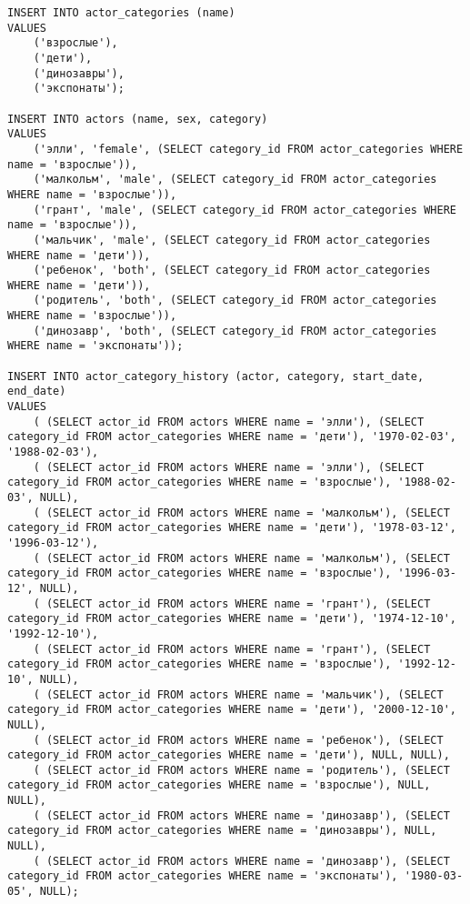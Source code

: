 
\begin{verbatim}
INSERT INTO actor_categories (name)
VALUES
    ('взрослые'),
    ('дети'),
    ('динозавры'),
    ('экспонаты');

INSERT INTO actors (name, sex, category)
VALUES
    ('элли', 'female', (SELECT category_id FROM actor_categories WHERE name = 'взрослые')),
    ('малкольм', 'male', (SELECT category_id FROM actor_categories WHERE name = 'взрослые')),
    ('грант', 'male', (SELECT category_id FROM actor_categories WHERE name = 'взрослые')),
    ('мальчик', 'male', (SELECT category_id FROM actor_categories WHERE name = 'дети')),
    ('ребенок', 'both', (SELECT category_id FROM actor_categories WHERE name = 'дети')),
    ('родитель', 'both', (SELECT category_id FROM actor_categories WHERE name = 'взрослые')),
    ('динозавр', 'both', (SELECT category_id FROM actor_categories WHERE name = 'экспонаты'));

INSERT INTO actor_category_history (actor, category, start_date, end_date)
VALUES
    ( (SELECT actor_id FROM actors WHERE name = 'элли'), (SELECT category_id FROM actor_categories WHERE name = 'дети'), '1970-02-03', '1988-02-03'),
    ( (SELECT actor_id FROM actors WHERE name = 'элли'), (SELECT category_id FROM actor_categories WHERE name = 'взрослые'), '1988-02-03', NULL),
    ( (SELECT actor_id FROM actors WHERE name = 'малкольм'), (SELECT category_id FROM actor_categories WHERE name = 'дети'), '1978-03-12', '1996-03-12'),
    ( (SELECT actor_id FROM actors WHERE name = 'малкольм'), (SELECT category_id FROM actor_categories WHERE name = 'взрослые'), '1996-03-12', NULL),
    ( (SELECT actor_id FROM actors WHERE name = 'грант'), (SELECT category_id FROM actor_categories WHERE name = 'дети'), '1974-12-10', '1992-12-10'),
    ( (SELECT actor_id FROM actors WHERE name = 'грант'), (SELECT category_id FROM actor_categories WHERE name = 'взрослые'), '1992-12-10', NULL),
    ( (SELECT actor_id FROM actors WHERE name = 'мальчик'), (SELECT category_id FROM actor_categories WHERE name = 'дети'), '2000-12-10', NULL),
    ( (SELECT actor_id FROM actors WHERE name = 'ребенок'), (SELECT category_id FROM actor_categories WHERE name = 'дети'), NULL, NULL),
    ( (SELECT actor_id FROM actors WHERE name = 'родитель'), (SELECT category_id FROM actor_categories WHERE name = 'взрослые'), NULL, NULL),
    ( (SELECT actor_id FROM actors WHERE name = 'динозавр'), (SELECT category_id FROM actor_categories WHERE name = 'динозавры'), NULL, NULL),
    ( (SELECT actor_id FROM actors WHERE name = 'динозавр'), (SELECT category_id FROM actor_categories WHERE name = 'экспонаты'), '1980-03-05', NULL);


\end{verbatim}

